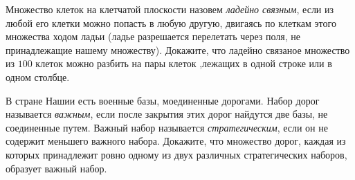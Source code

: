 \begin{exersize}
	Множество клеток на клетчатой плоскости назовем \emph{ладейно связным}, если из любой его клетки можно попасть в любую другую, двигаясь по клеткам этого множества ходом ладьи (ладье разрешается перелетать через поля, не принадлежащие нашему множеству). Докажите, что ладейно связаное множество из $100$ клеток можно разбить на пары клеток ,лежащих в одной строке или в одном столбце.
\end{exersize}	

\begin{exersize}
	В стране Нашии есть военные базы, моединенные дорогами. Набор дорог называется \emph{важным}, если после закрытия этих дорог найдутся две базы, не соединенные путем. Важный набор называется \emph{стратегическим}, если он не содержит меньшего важного набора. Докажите, что множество дорог, каждая из которых принадлежит ровно одному из двух различных стратегических наборов, образует важный набор.
\end{exersize}	